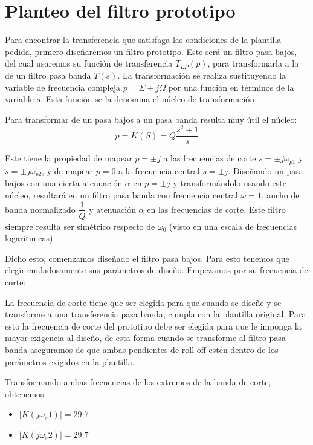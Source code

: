 \documentclass[11pt,a4paper]{report}
\begin{document}
\section{Planteo del filtro prototipo}

Para encontrar la transferencia que satisfaga las condiciones de la plantilla pedida, primero diseñaremos un filtro prototipo. Este será un filtro pasa-bajos, del cual usaremos su función de transferencia $T_{LP}(p)$, para transformarla a la de un filtro pasa banda $T(s)$. La transformación se realiza sustituyendo la variable de frecuencia compleja $p = \Sigma + j\Omega$ por una función en términos de la variable $s$. Esta función se la denomina el núcleo de transformación.

Para transformar de un pasa bajos a un pasa banda resulta muy útil el núcleo: \newline
$$p = K(S) = Q \dfrac{s^2 + 1}{s}$$

Este tiene la propiedad de mapear $p=\pm j$ a las frecuencias de corte $s=\pm j\omega_{p1}$ y $s=\pm j\omega_{p2}$, y de mapear $p=0$ a la frecuencia central $s=\pm j$.
Diseñando un pasa bajos con una cierta atenuación $\alpha$ en $p = \pm j$ y transformándolo usando este núcleo, resultará en un filtro pasa banda con frecuencia central $\omega = 1$, ancho de banda normalizado $\dfrac{1}{Q}$ y atenuación $\alpha$ en las frecuencias de corte. Este filtro siempre resulta ser simétrico respecto de $\omega_0$ (visto en una escala de frecuencias logarítmicas).

Dicho esto, comenzamos diseñado el filtro pasa bajos. Para esto tenemos que elegir cuidadosamente sus parámetros de diseño. Empezamos por su frecuencia de corte:

La frecuencia de corte tiene que ser elegida para que cuando se diseñe y se transforme a una transferencia pasa banda, cumpla con la plantilla original. Para esto la frecuencia de corte del prototipo debe ser elegida para que le imponga la mayor exigencia al diseño, de esta forma cuando se transforme al filtro pasa banda aseguramos de que ambas pendientes de roll-off estén dentro de los parámetros exigidos en la plantilla.

Transformando ambas frecuencias de los extremos de la banda de corte, obtenemos:

\begin{itemize}
    \item $|K(j \omega_s1)| = 29.7$
    \item $|K(j \omega_s2)| = 29.7$
\end{itemize}
\end{document}
